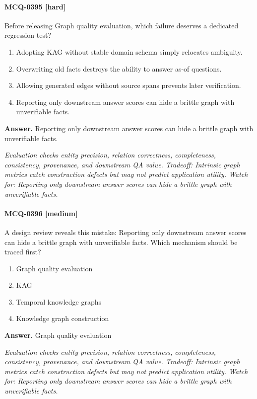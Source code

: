 \paragraph{MCQ-0395 [hard]} Before releasing Graph quality evaluation, which failure deserves a dedicated regression test?
\begin{enumerate}[label=\Alph*.]
\item Adopting KAG without stable domain schema simply relocates ambiguity.
\item Overwriting old facts destroys the ability to answer as-of questions.
\item Allowing generated edges without source spans prevents later verification.
\item Reporting only downstream answer scores can hide a brittle graph with unverifiable facts.
\end{enumerate}
\noindent\textbf{Answer.} Reporting only downstream answer scores can hide a brittle graph with unverifiable facts.
\par\textit{Evaluation checks entity precision, relation correctness, completeness, consistency, provenance, and downstream QA value. Tradeoff: Intrinsic graph metrics catch construction defects but may not predict application utility. Watch for: Reporting only downstream answer scores can hide a brittle graph with unverifiable facts.}
\paragraph{MCQ-0396 [medium]} A design review reveals this mistake: Reporting only downstream answer scores can hide a brittle graph with unverifiable facts. Which mechanism should be traced first?
\begin{enumerate}[label=\Alph*.]
\item Graph quality evaluation
\item KAG
\item Temporal knowledge graphs
\item Knowledge graph construction
\end{enumerate}
\noindent\textbf{Answer.} Graph quality evaluation
\par\textit{Evaluation checks entity precision, relation correctness, completeness, consistency, provenance, and downstream QA value. Tradeoff: Intrinsic graph metrics catch construction defects but may not predict application utility. Watch for: Reporting only downstream answer scores can hide a brittle graph with unverifiable facts.}
